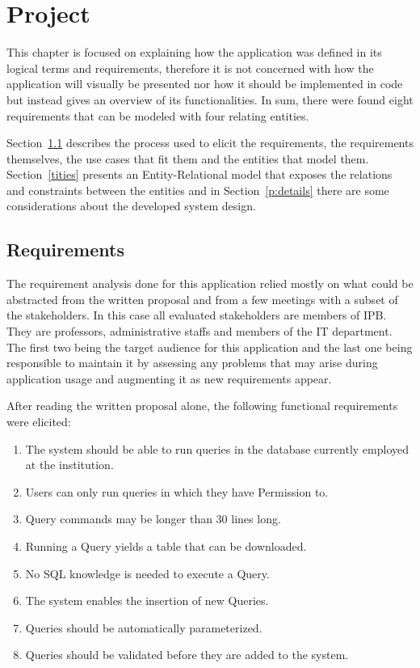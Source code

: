 \chapter{Project}\label{chap:project}

This chapter is focused on explaining how the application was defined in its logical terms and requirements, therefore it is not concerned with how the application will visually be presented nor how it should be implemented in code but instead gives an overview of its functionalities. In sum, there were found eight requirements that can be modeled with four relating entities. 

Section~\ref{p:req} describes the process used to elicit the requirements, the requirements themselves, the use cases that fit them and the entities that model them. Section~\ref{tities} presents an Entity-Relational model that exposes the relations and constraints between the entities and in Section~\ref{p:details} there are some considerations about the developed system design.

\section{Requirements}\label{p:req}
The requirement analysis done for this application relied mostly on what could be abstracted from the written proposal and from a few meetings with a subset of the stakeholders.
In this case all evaluated stakeholders are members of \gls{IPB}. They are professors, administrative staffs and members of the \gls{IT} department. 
The first two being the target audience for this application and the last one being responsible to maintain it by assessing any problems that may arise during application usage and augmenting it as new requirements appear.

After reading the written proposal alone, the following functional requirements were elicited:

\begin{enumerate}
\item The system should be able to run queries in the database currently employed at the institution.\label{req:multidb}
\item Users can only run queries in which they have Permission to.\label{req:permission}
\item Query commands may be longer than 30 lines long.\label{req:longquery}
\item Running a Query yields a table that can be downloaded.\label{req:download}
\item No \gls{SQL} knowledge is needed to execute a Query.\label{req:noknowledge}
\item The system enables the insertion of new Queries.\label{req:addquery}
\item Queries should be automatically parameterized.\label{req:no:param}
\item Queries should be validated before they are added to the system.\label{req:no:valid}
\end{enumerate}

